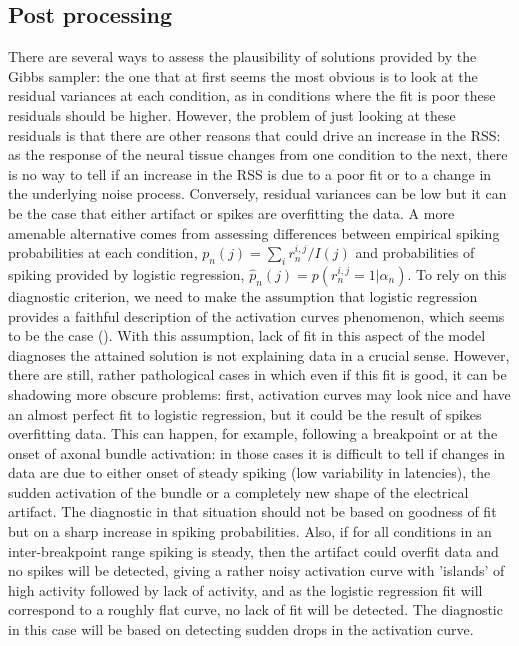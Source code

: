 \documentclass[12pt,letterpaper,fleqn]{article}
\begin{document}
\subsection{Post processing}
There are several ways to assess the plausibility of solutions provided by the Gibbs sampler: the one that at first seems the most obvious is to look at the residual variances at each condition, as in conditions where the fit is poor these residuals should be higher. However, the problem of just looking at these residuals is that there are other reasons that could drive an increase in the RSS: as the response of the neural tissue changes from one condition to the next, there is no way to tell if an increase in the RSS is due to a poor fit or to a change in the underlying noise process. Conversely, residual variances can be low but it can be the case that either artifact or spikes are overfitting the data. A more amenable alternative comes from assessing differences between empirical spiking probabilities at each condition, $p_n(j)=\sum_i r_n^{i,j}/I(j)$ and probabilities of spiking provided by logistic regression, $\hat{p}_n(j)=p(r_n^{i,j}=1|\alpha_n)$. To rely on this diagnostic criterion, we need to make the assumption that logistic regression provides a faithful description of the activation curves phenomenon, which seems to be the case (\cite{GrosbergEtal14}). With this assumption, lack of fit in this aspect of the model diagnoses the attained solution is not explaining data in a crucial sense. 
However, there are still, rather pathological cases in which even if this fit is good, it can be shadowing more obscure problems: first, activation curves may look nice and have an almost perfect fit to logistic regression, but it could be the result of spikes overfitting data. This can happen, for example, following a breakpoint or at the onset of axonal bundle activation: in those cases it is difficult to tell if changes in data are due to either onset of steady spiking (low variability in latencies), the sudden activation of the bundle or a completely new shape of the electrical artifact. The diagnostic in that situation should not be based on goodness of fit but on a sharp increase in spiking probabilities. Also, if for all conditions in an inter-breakpoint range spiking is steady, then the artifact could overfit data and no spikes will be detected, giving a rather noisy activation curve with 'islands' of high activity followed by lack of activity, and as the logistic regression fit will correspond to a roughly flat curve, no lack of fit will be detected. The diagnostic in this case will be based on detecting sudden drops in the activation curve.\\
\end{document}
